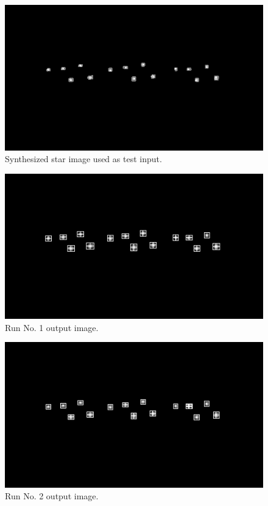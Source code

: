 \documentclass[12pt]{report}
\begin{document}
\begin{figure}[!h]
    \centering
    \includegraphics[scale=1.2]{results/t_in.png}
    \caption{Synthesized star image used as test input.}
    \label{res:t_in}
\end{figure}
\begin{figure}[!h]
    \centering
    \includegraphics[scale=1.2]{results/t0.png}
    \caption{Run No. 1 output image.}
    \label{res:t0}
\end{figure}
\begin{figure}[!h]
    \centering
    \includegraphics[scale=1.2]{results/t1.png}
    \caption{Run No. 2 output image.}
    \label{res:t1}
\end{figure}
\end{document}
